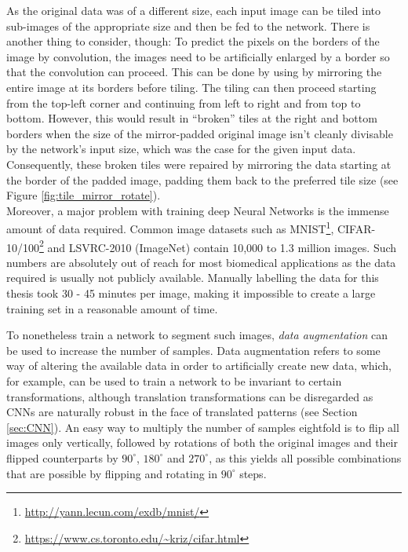 As the original data was of a different size, each input image can be tiled into sub-images of the appropriate size and then be fed to the network. There is another thing to consider, though: To predict the pixels on the borders of the image by convolution, the images need to be artificially enlarged by a border so that the convolution can proceed. This can be done by using by mirroring the entire image at its borders before tiling. The tiling can then proceed starting from the top-left corner and continuing from left to right and from top to bottom. However, this would result in ``broken'' tiles at the right and bottom borders when the size of the mirror-padded original image isn't cleanly divisable by the network's input size, which was the case for the given input data. Consequently, these broken tiles were repaired by mirroring the data starting at the border of the padded image, padding them back to the preferred tile size (see Figure \ref{fig:tile_mirror_rotate}).\\

\noindent Moreover, a major problem with training deep Neural Networks is the immense amount of data required. Common image datasets such as MNIST\footnote{\url{http://yann.lecun.com/exdb/mnist/}}, CIFAR-10/100\footnote{\url{https://www.cs.toronto.edu/~kriz/cifar.html}} and LSVRC-2010 (ImageNet)\cite{ILSVRC} contain 10,000 to 1.3 million images. Such numbers are absolutely out of reach for most biomedical applications as the data required is usually not publicly available. Manually labelling the data for this thesis took 30 - 45 minutes per image, making it impossible to create a large training set in a reasonable amount of time.

To nonetheless train a network to segment such images, \textit{data augmentation} can be used to increase the number of samples. Data augmentation refers to some way of altering the available data in order to artificially create new data, which, for example, can be used to train a network to be invariant to certain transformations, although translation transformations can be disregarded as CNNs are naturally robust in the face of translated patterns (see Section \ref{sec:CNN}). An easy way to multiply the number of samples eightfold is to flip all images only vertically, followed by rotations of both the original images and their flipped counterparts by $90^{\circ}$, $180^{\circ}$ and $270^{\circ}$, as this yields all possible combinations that are possible by flipping and rotating in $90^{\circ}$ steps.\\


